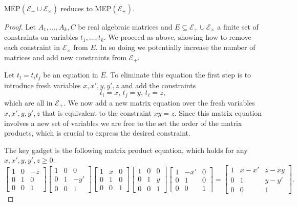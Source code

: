 \begin{proposition}
  MEP$(\mathcal{E}_{+}\cup\mathcal{E}_{\times})$ reduces to
  MEP$(\mathcal{E}_{+})$.
\label{lem:times}
\end{proposition}

\begin{proof}
  Let $A_1,\ldots,A_k,C$ be real algebraic matrices and
  $E \subseteq\mathcal{E}_{+}\cup\mathcal{E}_{\times}$ a finite set of
  constraints on variables $t_1,\ldots,t_k$.  We proceed as above,
  showing how to remove each constraint in
  $\mathcal{E}_{\times}$ from $E$.  In so doing we potentially increase the
  number of matrices and add new constraints from $\mathcal{E}_{+}$.

  Let $t_l=t_{i} t_{j}$ be an equation in $E$.  To eliminate this equation
the first step is to introduce fresh
variables $x,x',y,y',z$ and add the constraints
\[ t_{i}=x,\, t_{j}=y,\, t_{\ell} = z,\]
which are all in $\mathcal{E}_{+}$.  We now add a new matrix equation
over the fresh variables $x,x',y,y',z$ that is equivalent to the
constraint $xy=z$.  Since this matrix equation involves a new set of
variables we are free to the set the order of the matrix products,
which is crucial to express the desired constraint.

The key gadget is the following matrix product equation,
  which holds for  any $x,x',y,y',z\geqslant0$:
\begin{equation*}
\begin{bmatrix}1&0&-z\\0&1&0\\0&0&1\end{bmatrix}
\begin{bmatrix}1&0&0\\0&1&-y'\\0&0&1\end{bmatrix}
\begin{bmatrix}1&x&0\\0&1&0\\0&0&1\end{bmatrix}
\begin{bmatrix}1&0&0\\0&1&y\\0&0&1\end{bmatrix}
\begin{bmatrix}1&-x'&0\\0&1&0\\0&0&1\end{bmatrix}=
\begin{bmatrix}1&x-x'&z-xy\\0&1&y-y'\\0&0&1\end{bmatrix}.
\end{equation*}


\end{proof}
